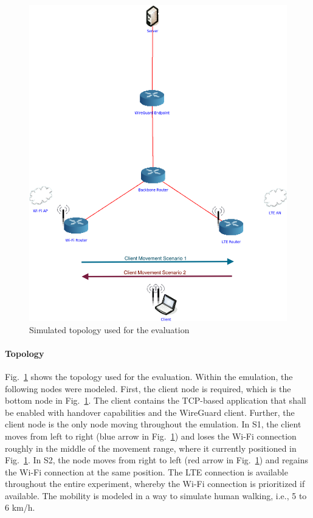 \begin{figure}[ht]
    \centering
    \includegraphics[width=.9\columnwidth]{figures/migration/topo.png}
    \caption{Simulated topology used for the evaluation}
    \label{fig:eval:mig:topo}
\end{figure}

\paragraph{Topology}
Fig.~\ref{fig:eval:mig:topo} shows the topology used for the evaluation.
Within the emulation, the following nodes were modeled.
First, the client node is required, which is the bottom node in Fig.~\ref{fig:eval:mig:topo}.
The client contains the TCP-based application that shall be enabled with handover capabilities and the WireGuard client.
Further, the client node is the only node moving throughout the emulation.
In S1, the client moves from left to right (blue arrow in Fig.~\ref{fig:eval:mig:topo}) and loses the Wi-Fi connection roughly in the middle of the movement range, where it currently positioned in Fig.~\ref{fig:eval:mig:topo}. In S2, the node moves from right to left (red arrow in Fig.~\ref{fig:eval:mig:topo}) and regains the Wi-Fi connection at the same position.
The LTE connection is available throughout the entire experiment, whereby the Wi-Fi connection is prioritized if available.
The mobility is modeled in a way to simulate human walking, i.e., 5 to 6 km/h.

